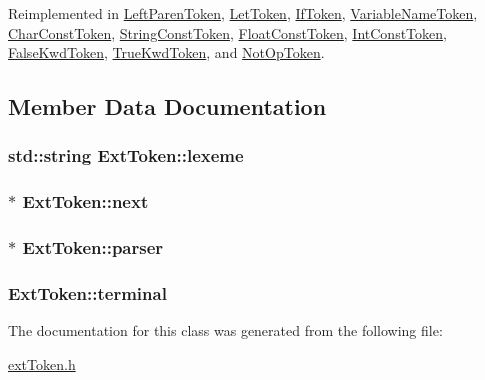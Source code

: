 Reimplemented in \hyperlink{classLeftParenToken_a3cb3ae9ab2647e5534c85529d314f08b}{Left\-Paren\-Token}, \hyperlink{classLetToken_a14df948cdf775bde8392bf58d53b91f3}{Let\-Token}, \hyperlink{classIfToken_add06bd79ce755fd5503f78e507109e52}{If\-Token}, \hyperlink{classVariableNameToken_a6e775ad5b8c2eafd2e2a185ab90b1f27}{Variable\-Name\-Token}, \hyperlink{classCharConstToken_a33032d6b35ef2b6ebc4db770b374ad5b}{Char\-Const\-Token}, \hyperlink{classStringConstToken_a4767bba84d30289ab31d501f240b80fb}{String\-Const\-Token}, \hyperlink{classFloatConstToken_a991e92ae34d0b01a3b1dd08ed01b8e6e}{Float\-Const\-Token}, \hyperlink{classIntConstToken_ae1f720d6006c47e145cae7879d09c708}{Int\-Const\-Token}, \hyperlink{classFalseKwdToken_adc06b0433535d552c1e7f8076d756fb3}{False\-Kwd\-Token}, \hyperlink{classTrueKwdToken_ad86f05acb9483438db153eab44aa6dac}{True\-Kwd\-Token}, and \hyperlink{classNotOpToken_a55a0dd53742aaca04338c16be079b031}{Not\-Op\-Token}.



\subsection{Member Data Documentation}
\hypertarget{classExtToken_a5af1643a542ef7ee8ca0f82706383ae3}{
\subsubsection[{lexeme}]{\setlength{\rightskip}{0pt plus 5cm}std\-::string Ext\-Token\-::lexeme}}\label{classExtToken_a5af1643a542ef7ee8ca0f82706383ae3}
\hypertarget{classExtToken_aa02995a897183b2a6ef758e541534e46}{
\subsubsection[{next}]{$\ast$ Ext\-Token\-::next}}\label{classExtToken_aa02995a897183b2a6ef758e541534e46}
\hypertarget{classExtToken_af70d22156d5f8e855a8b0d92a82706ba}{
\subsubsection[{parser}]{$\ast$ Ext\-Token\-::parser}}\label{classExtToken_af70d22156d5f8e855a8b0d92a82706ba}
\hypertarget{classExtToken_abbdaef42b65403cdc0247839ef95c875}{
\subsubsection[{terminal}]{ Ext\-Token\-::terminal}}\label{classExtToken_abbdaef42b65403cdc0247839ef95c875}


The documentation for this class was generated from the following file\-:\begin{DoxyCompactItemize}
\item 
\hyperlink{extToken_8h}{ext\-Token.\-h}\end{DoxyCompactItemize}
